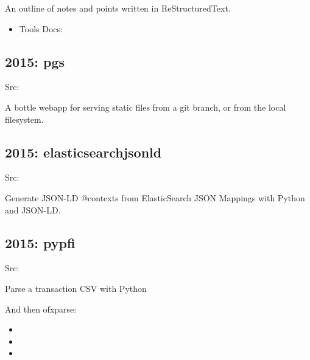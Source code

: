 \documentclass[letter,,openany,oneside,english]{sphinxhowto}
\begin{document}
An outline of notes and points
written in ReStructuredText.
\begin{itemize}
\item {} 
Tools Docs:

\end{itemize}


\subsection{2015: pgs}
\label{\detokenize{resume:pgs}}
\begin{DUlineblock}{0em}
\item[] Src: 
\end{DUlineblock}

A bottle webapp for serving static files from a git branch, or from the local filesystem.


\subsection{2015: elasticsearchjsonld}
\label{\detokenize{resume:elasticsearchjsonld}}
\begin{DUlineblock}{0em}
\item[] Src: 
\end{DUlineblock}

Generate JSON-LD @contexts from ElasticSearch JSON Mappings
with Python and JSON-LD.


\subsection{2015: pypfi}
\label{\detokenize{resume:pypfi}}
\begin{DUlineblock}{0em}
\item[] Src: 
\end{DUlineblock}

Parse a transaction CSV with Python

And then ofxparse:
\begin{itemize}
\item {} 

\item {} 

\item {} 

\end{itemize}
\end{document}
